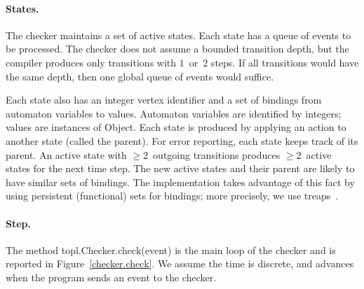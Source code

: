 \documentclass[10pt, preprint]{sigplanconf} %
\begin{document}
\paragraph{States.}
The checker maintains a set of active states.
Each state has a queue of events to be processed.
The checker does not assume a bounded transition depth, but the compiler produces only transitions with $1$~or~$2$ steps.
If all transitions would have the same depth, then one global queue of events would suffice.

Each state also has an integer vertex identifier and a set of bindings from automaton variables to values.
Automaton variables are identified by integers; values are instances of \textsf{Object}.
Each state is produced by applying an action to another state (called the parent).
For error reporting, each state keeps track of its parent.
An active state with $\ge2$~outgoing transitions produces $\ge2$~active states for the next time step.
The new active states and their parent are likely to have similar sets of bindings.
The implementation takes advantage of this fact by using persistent (functional) sets for bindings; more precisely, we use treaps~\cite{DBLP:conf/focs/AragonS89}.

\paragraph{Step.}
The method \textsf{topl.Checker.check(event)} is the main loop of the checker and is reported in Figure~\ref{checker.check}.
We assume the time is discrete, and advances when the program sends an event to the checker.
\end{document}
